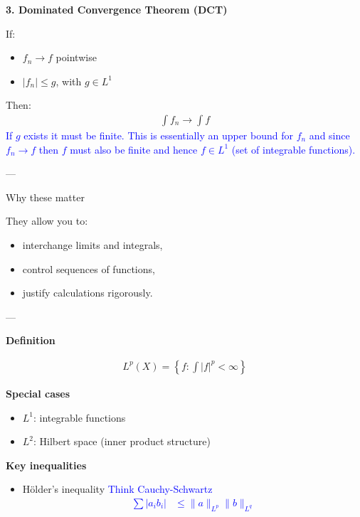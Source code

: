 \documentclass[12pt,a4paper]{report}
\newcommand{\BLUE}[1]{\textcolor{blue}{#1}}
\begin{document}
\begin{description}
\begin{description}
    \item \textbf{3. Dominated Convergence Theorem (DCT)}

If:
		\begin{itemize}
        \item $f_n \to f$ pointwise
        \item $|f_n| \le g$, with $g \in L^1$
		\end{itemize}

Then:
\begin{align*}
\int f_n \to \int f
\end{align*}\BLUE{If $g$ exists it must be finite.  This is essentially an upper bound for $f_n$ and since $f_n \to f$ then $f$ must also be finite and hence $f\in L^1$ (set of integrable functions).}

---

\item Why these matter

They allow you to:
		\begin{itemize}
        \item interchange limits and integrals,
        \item control sequences of functions,
        \item justify calculations rigorously.
		\end{itemize}
	\end{description}

---

\item {}

	\begin{description}
    \item \textbf{Definition}

\begin{align*}
L^p(X) = \left\{ f : \int |f|^p < \infty \right\}
\end{align*}

    \item \textbf{Special cases}

		\begin{itemize}
        \item $L^1$: integrable functions
        \item $L^2$: Hilbert space (inner product structure)
		\end{itemize}

    \item \textbf{Key inequalities}

		\begin{itemize}
        \item Hölder’s inequality \BLUE{Think Cauchy-Schwartz
		\begin{align*}
			\sum |a_ib_i|  &\le \|a\|_{L^p} \|b\|_{L^q}
		\end{align*}
		}


\end{itemize}
\end{description}
\end{description}
\end{document}

